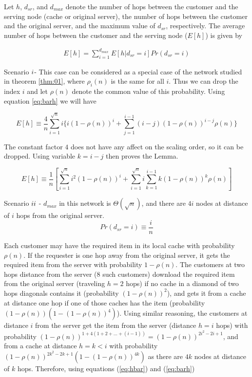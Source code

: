 \documentclass[journal]{IEEEtran}
\theoremstyle{plain}
\theoremstyle{remark}
\begin{document}
\begin{IEEEproof}
Let $h$, $d_{sr}$, and $d_{max}$ denote the number of hops between the customer and the serving node (cache or original server), the number of hops between the customer and the original server, and the maximum value of $d_{sr}$, respectively. The average number of hops between the customer and the serving node ($E[h]$) is given by

\begin{eqnarray}
E[h]=\sum_{i=1}^{d_{max}} E[h|d_{sr}=i]Pr(d_{sr}=i) \label{eq:hbar}
\end{eqnarray}

Scenario $\romannumeral 1$- This case can be considered as a special case of the network studied in theorem \ref{thm:01}, where $\rho_i(n)$ is the same for all $i$. Thus we can drop the index $i$ and let $\rho(n)$ denote the common value of this probability. Using equation \ref{eq:barh} we will have

\begin{equation}
E[h]\equiv \frac{4}{n}\sum_{i=1}^{\sqrt{n}} i \{i(1-\rho(n))^i+\sum_{j=1}^{i-1} (i-j)(1-\rho(n))^{i-j}\rho(n)\} 
\end{equation}

The constant factor $4$ does not have any affect on the scaling order, so it can be dropped. Using variable $k=i-j$ then proves the Lemma.

\begin{equation}
E[h]\equiv\frac{1}{n} [ \sum_{i=1}^{\sqrt{n}} i^2(1-\rho(n))^i +\sum_{i=1}^{\sqrt{n}}i\sum_{k=1}^{i-1} k(1-\rho(n))^k\rho(n)] 
\end{equation}

Scenario $\romannumeral 2$ - $d_{max}$ in this network is $\Theta(\sqrt{n})$, and there are $4i$ nodes at distance of $i$ hops from the original server. 
\begin{equation}
Pr(d_{sr}=i)\equiv\frac{i}{n}
\end{equation}

Each customer may have the required item in its local cache with probability $\rho(n)$. If the requester is one hop away from the original server, it gets the required item from the server with probability $1-\rho(n)$. The customers at two hops distance from the server ($8$ such customers) download the required item from the original server (traveling $h=2$ hops) if no cache in a diamond of two hops diagonals contains it (probability $(1-\rho(n))^2$), and gets it from a cache at distance one hop if one of those caches has the item (probability $(1-\rho(n))(1-(1-\rho(n))^4)$). Using similar reasoning, the customers at distance $i$ from the server get the item from the server (distance $h=i$ hops) with probability $(1-\rho(n))^{1+4(1+2+...+(i-1))}=(1-\rho(n))^{2i^2-2i+1}$, and from a cache at distance $h=k<i$ with probability $(1-\rho(n))^{2k^2-2k+1}(1-(1-\rho(n))^{4k})$ as there are $4k$ nodes at distance of $k$ hops. Therefore, using equations (\ref{eq:hbar}) and (\ref{eq:barh})



\end{IEEEproof}
\end{document}
